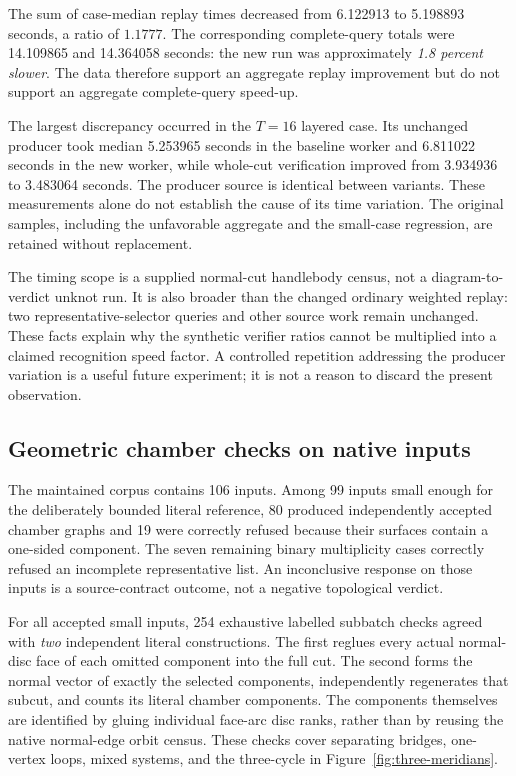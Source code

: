The sum of case-median replay times decreased from 6.122913 to 5.198893
seconds, a ratio of \(1.1777\). The corresponding complete-query totals
were 14.109865 and 14.364058 seconds: the new run was approximately
\emph{1.8 percent slower}. The data therefore support an aggregate replay
improvement but do not support an aggregate complete-query speed-up.

The largest discrepancy occurred in the \(T=16\) layered case. Its unchanged
producer took median 5.253965 seconds in the baseline worker and 6.811022
seconds in the new worker, while whole-cut verification improved from
3.934936 to 3.483064 seconds. The producer source is identical between
variants. These measurements alone do not establish the cause of its
time variation. The original samples, including the unfavorable aggregate
and the small-case regression, are retained without replacement.

The timing scope is a supplied normal-cut handlebody census, not a
diagram-to-verdict unknot run. It is also broader than the changed ordinary
weighted replay: two representative-selector queries and other source
work remain unchanged. These facts explain why the synthetic verifier
ratios cannot be multiplied into a claimed recognition speed factor.
A controlled repetition addressing the producer variation is a useful
future experiment; it is not a reason to discard the present observation.

\subsection{Geometric chamber checks on native inputs}

The maintained corpus contains 106 inputs. Among 99 inputs small enough
for the deliberately bounded literal reference, 80 produced independently
accepted chamber graphs and 19 were correctly refused because their
surfaces contain a one-sided component. The seven remaining binary
multiplicity cases correctly refused an incomplete representative list.
An inconclusive response on those inputs is a source-contract outcome,
not a negative topological verdict.

For all accepted small inputs, 254 exhaustive labelled subbatch checks
agreed with \emph{two} independent literal constructions. The first
reglues every actual normal-disc face of each omitted component into the
full cut. The second forms the normal vector of exactly the selected
components, independently regenerates that subcut, and counts its
literal chamber components. The components themselves are identified by
gluing individual face-arc disc ranks, rather than by reusing the native
normal-edge orbit census. These checks cover separating bridges,
one-vertex loops, mixed systems, and the three-cycle in
Figure~\ref{fig:three-meridians}.

